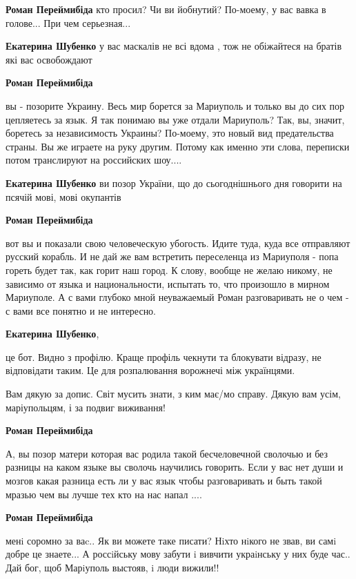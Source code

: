 \begin{itemize} %
\textbf{Роман Переймибіда} кто просил? Чи ви йобнутий? По-моему, у вас вавка в голове... При чем серьезная...

\textbf{Екатерина Шубенко} у вас маскалів не всі вдома , тож не обіжайтеся на братів які вас освобождают

\textbf{Роман Переймибіда} 

вы - позорите Украину. Весь мир борется за Мариуполь и только вы до сих пор
цепляетесь за язык. Я так понимаю вы уже отдали Мариуполь? Так, вы, значит,
боретесь за независимость Украины? По-моему, это новый вид предательства
страны. Вы же играете на руку другим. Потому как именно эти слова, переписки
потом транслируют на российских шоу....

\textbf{Екатерина Шубенко} ви позор України, що до сьогоднішнього дня говорити на псячій мові, мові окупантів

\textbf{Роман Переймибіда} 

вот вы и показали свою человеческую убогость. Идите туда, куда все отправляют
русский корабль. И не дай же вам встретить переселенца из Мариуполя - попа
гореть будет так, как горит наш город. К слову, вообще не желаю никому, не
зависимо от языка и национальности, испытать то, что произошло в мирном
Мариуполе. А с вами глубоко мной неуважаемый Роман разговаривать не о чем - с
вами все понятно и не интересно.

\textbf{Екатерина Шубенко}, 

це бот. Видно з профілю. Краще профіль чекнути та блокувати відразу, не
відповідати таким. Це для розпалювання ворожнечі між українцями.

Вам дякую за допис. Світ мусить знати, з ким має/мо справу. Дякую вам усім,
маріупольцям, і за подвиг виживання!

\textbf{Роман Переймибіда} 

А, вы позор матери которая вас родила такой бесчеловечной сволочью и без
разницы на каком языке вы сволочь научились говорить. Если у вас нет души и
мозгов какая разница есть ли у вас язык чтобы разговаривать и быть такой мразью
чем вы лучше тех кто на нас напал ....🤬

\textbf{Роман Переймибіда} 

менi соромно за ваc.. Як ви можете таке писати? Нiхто нiкого не звав, ви самi
добре це знаете... А россiйську мову забути i вивчити украiнську у них буде
час.. Дай бог, щоб Марiуполь выстояв, i люди вижили!! 🙏🙏🙏🙏


\end{itemize}
